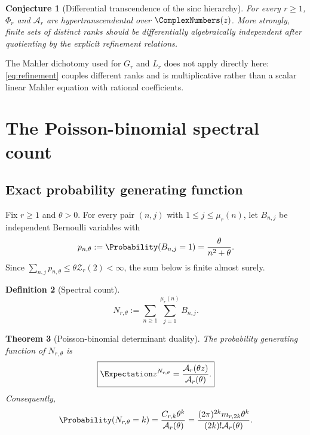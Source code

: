 \documentclass[11pt,oneside]{article}
\newtheorem{theorem}{Theorem}[section]
\newtheorem{conjecture}[theorem]{Conjecture}
\theoremstyle{definition}
\newtheorem{definition}[theorem]{Definition}
\theoremstyle{remark}
\newcommand{\ZetaR}{\mathcal Z}
\newcommand{\Ar}{\mathcal A}
\begin{document}
\begin{conjecture}[Differential transcendence of the sinc hierarchy]\label{conj:Phi-hyper}
For every $r\geq1$, $\Phi_r$ and $\Ar_r$ are hypertranscendental over
$\ComplexNumbers(z)$.  More strongly, finite sets of distinct ranks should be
differentially algebraically independent after quotienting by the explicit
refinement relations.
\end{conjecture}

The Mahler dichotomy used for $G_r$ and $L_r$ does not apply directly here:
\eqref{eq:refinement} couples different ranks and is multiplicative rather
than a scalar linear Mahler equation with rational coefficients.

\section{The Poisson-binomial spectral count}

\subsection{Exact probability generating function}

Fix $r\geq1$ and $\theta>0$.  For every pair $(n,j)$ with
$1\leq j\leq\mu_r(n)$, let $B_{n,j}$ be independent Bernoulli variables with
\begin{equation}\label{eq:p-n}
 p_{n,\theta}:=\Probability(B_{n,j}=1)=\frac{\theta}{n^2+\theta}.
\end{equation}
Since
$\sum_{n,j}p_{n,\theta}\leq\theta\ZetaR_r(2)<\infty$, the sum below is finite
almost surely.

\begin{definition}[Spectral count]\label{def:N}
\begin{equation}\label{eq:N-def}
 N_{r,\theta}:=\sum_{n\geq1}\sum_{j=1}^{\mu_r(n)}B_{n,j}.
\end{equation}
\end{definition}

\begin{theorem}[Poisson-binomial determinant duality]\label{thm:PB-dual}
The probability generating function of $N_{r,\theta}$ is
\begin{equation}\label{eq:PB-pgf}
 \boxed{
 \Expectation z^{N_{r,\theta}}=
 \frac{\Ar_r(\theta z)}{\Ar_r(\theta)}.}
\end{equation}
Consequently,
\begin{equation}\label{eq:PB-prob}
 \Probability(N_{r,\theta}=k)
 =\frac{C_{r,k}\theta^k}{\Ar_r(\theta)}
 =\frac{(2\pi)^{2k}m_{r,2k}\theta^k}
 {(2k)!\Ar_r(\theta)}.
\end{equation}
\end{theorem}
\end{document}
